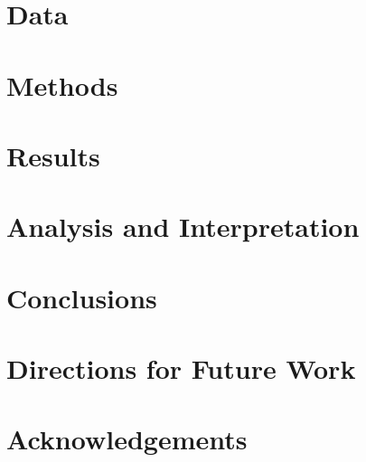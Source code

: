 \documentclass[11pt,a4paper,titlepage]{article}
\begin{document}
    \section{Data}\label{sec:data}
    


    \section{Methods}\label{sec:methods}
    


    \section{Results}\label{sec:results}
    


    \section{Analysis and Interpretation}\label{sec:analysis-and-interpretation}
    


    \section{Conclusions}\label{sec:conclusions}
    


    \section{Directions for Future Work}\label{sec:directions-for-future-work}
    


    \section{Acknowledgements}\label{sec:acknowledgements}
    

    

\end{document}
